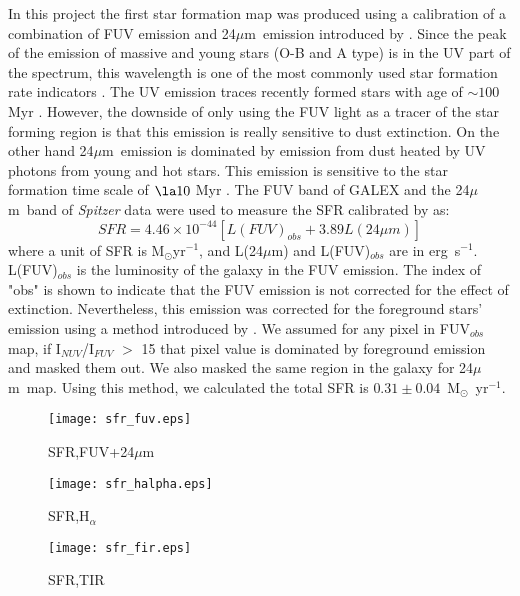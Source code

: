 \documentclass[useAMS,usenatbib]{mn2e}
\newcommand \halpha    {H$\alpha $\ }
\newcommand \um    {$\mu$m\ }
\newcommand \Spitzer {{\it Spitzer }}
\newcommand \Galex {GALEX }
\begin{document}
In this project the first star formation map was produced using a calibration of a combination of FUV emission and 24\um emission introduced by \cite{Hao11}. Since the peak of the emission of massive and young stars (O-B and A type) is in the UV part of the spectrum, this wavelength is one of the most commonly used star formation rate indicators \citep[e.g.,][]{Kennicutt89}. The UV emission traces recently formed stars with age of $\sim 100$ Myr \citep[e.g.,][]{Kennicutt98a, Calzetti05}. However, the downside of only using the FUV light as a tracer of the star forming region is that this emission is really sensitive to dust extinction. On the other hand 24\um emission is dominated by emission from dust heated by UV photons from young and hot stars. This emission is sensitive to the star formation time scale of $\la10$ Myr \citep{Calzetti07}. The FUV band of \Galex and the 24\um band of \Spitzer data were used to measure the SFR calibrated by \cite{Hao11} as:
\begin{equation}
\label{equ: fuvplus24}
SFR =4.46\times10^{-44}[L(FUV)_{obs}+3.89L(24\mu m)]
\end{equation}
where a unit of SFR is M$_{\odot}$yr$^{-1}$, and L(24$\mu$m) and L(FUV)$_{obs}$ are in erg~s$^{-1}$. L(FUV)$_{obs}$ is the luminosity of the galaxy in the FUV emission. The index of "obs" is shown to indicate that the FUV emission is not corrected for the effect of extinction. Nevertheless, this emission was corrected for the foreground stars' emission using a method introduced by \cite{Leroy08}. We assumed for any pixel in FUV$_{obs}$ map, if I$_{NUV}$/I$_{FUV}$ $>$ 15 that pixel value is dominated by foreground emission and masked them out. We also masked the same region in the galaxy for 24\um map. Using this method, we calculated the total SFR is $0.31\pm 0.04$~M$_{\odot}$~yr$^{-1}$.


\begin{figure*}
    \centering
    \begin{subfigure}[b]{1\textwidth}
        \centering
        \texttt{[image: sfr\_fuv.eps]}
        \caption{SFR,FUV+24\um}
        \label{fig:sfr,fuv}
    \end{subfigure}
    \hfill
    \begin{subfigure}[b]{1\textwidth}
        \centering
        \texttt{[image: sfr\_halpha.eps]}
        \caption{SFR,H$_{\alpha}$}
        \label{fig:sfr_halpha}
    \end{subfigure}
    \hfill
    \begin{subfigure}[b]{1\textwidth}
        \centering
        \texttt{[image: sfr\_fir.eps]}
        \caption{SFR,TIR}
        \label{fig:sfr,fir}
    \end{subfigure}
    \caption{SFR map from a combination of FUV + 24\um emission (top), \halpha and 24\um emission (middle), and total infrared emission (bottom)}
    \label{fig:sfrs}
\end{figure*}
\end{document}
